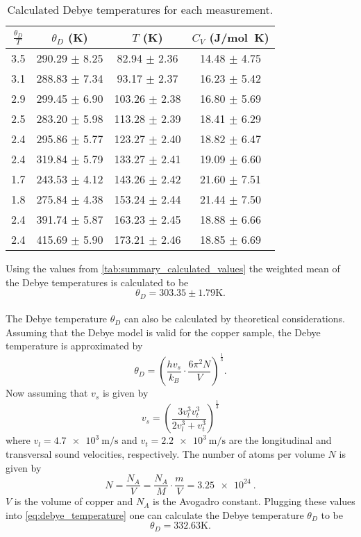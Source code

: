 \begin{table}[H]
  \centering
  \caption{Calculated Debye temperatures for each measurement.}
  \label{tab:summary_calculated_values}
  \begin{tabular}{cccc}
      \toprule
      $\frac{\theta_D}{T}$ & $\theta_D$ (\si{\kelvin})& $T$ (\si{\kelvin}) & $C_V$ (\si{\joule/\mol\kelvin}) \\
      \midrule
      3.5 & 290.29 $\pm$ 8.25 & 82.94 $\pm$ 2.36 & 14.48 $\pm$ 4.75 \\
      3.1 & 288.83 $\pm$ 7.34 & 93.17 $\pm$ 2.37 & 16.23 $\pm$ 5.42 \\
      2.9 & 299.45 $\pm$ 6.90 & 103.26 $\pm$ 2.38 & 16.80 $\pm$ 5.69 \\
      2.5 & 283.20 $\pm$ 5.98 & 113.28 $\pm$ 2.39 & 18.41 $\pm$ 6.29 \\
      2.4 & 295.86 $\pm$ 5.77 & 123.27 $\pm$ 2.40 & 18.82 $\pm$ 6.47 \\
      2.4 & 319.84 $\pm$ 5.79 & 133.27 $\pm$ 2.41 & 19.09 $\pm$ 6.60 \\
      1.7 & 243.53 $\pm$ 4.12 & 143.26 $\pm$ 2.42 & 21.60 $\pm$ 7.51 \\
      1.8 & 275.84 $\pm$ 4.38 & 153.24 $\pm$ 2.44 & 21.44 $\pm$ 7.50 \\
      2.4 & 391.74 $\pm$ 5.87 & 163.23 $\pm$ 2.45 & 18.88 $\pm$ 6.66 \\
      2.4 & 415.69 $\pm$ 5.90 & 173.21 $\pm$ 2.46 & 18.85 $\pm$ 6.69 \\
      \bottomrule
  \end{tabular}
\end{table}
Using the values from \autoref{tab:summary_calculated_values} the weighted mean of the Debye temperatures is calculated to be
\begin{equation*}
    \theta_D = 303.35 \pm 1.79 \si{\kelvin}.
\end{equation*}
\\
The Debye temperature $\theta_D$ can also be calculated by theoretical considerations. Assuming that the Debye model is valid for the copper sample,
the Debye temperature is approximated by
\begin{equation}\label{eq:debye_temperature}
    \theta_D = \left(\frac{hv_s}{k_B} \cdot \frac{6 \pi^2 N}{V}\right)^{\frac{1}{3}}.
\end{equation}
Now assuming that $v_s$ is given by
\begin{equation*}
  v_s = (\frac{3 v_l^3 v_t^3}{2 v_l^3 + v_t^3})^{\frac{1}{3}}	
\end{equation*}
where $v_l = \SI{4.7e3}{\m\per\s}$ and $v_t = \SI{2.2e3}{\m\per\s}$ \cite{V47} are the longitudinal and transversal sound velocities, respectively. The number of atoms per volume $N$ is given by
\begin{equation*}
    N = \frac{N_A}{V} = \frac{N_A}{M} \cdot \frac{m}{V} = \SI{3.25e24}{}.
\end{equation*}
$V$ is the volume of copper and $N_A$ is the Avogadro constant. Plugging these values into \autoref{eq:debye_temperature} one can calculate the Debye temperature $\theta_D$ to be
\begin{equation*}
    \theta_D = 332.63 \si{\kelvin}.
\end{equation*}